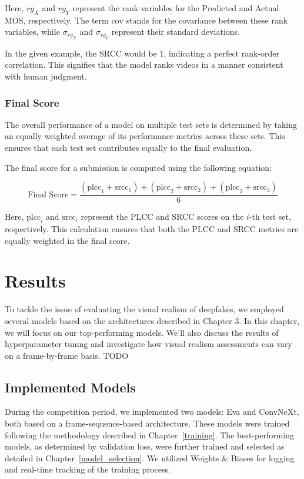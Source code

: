 \documentclass[a4paper,12pt,openright]{book}
\begin{document}
Here, \(rg_X\) and \(rg_Y\) represent the rank variables for the Predicted and Actual MOS, respectively. The term \(\text{cov}\) stands for the covariance between these rank variables, while \(\sigma_{rg_X}\) and \(\sigma_{rg_Y}\) represent their standard deviations. 

In the given example, the SRCC would be 1, indicating a perfect rank-order correlation. This signifies that the model ranks videos in a manner consistent with human judgment.

\subsection{Final Score}

The overall performance of a model on multiple test sets is determined by taking an equally weighted average of its performance metrics across these sets. This ensures that each test set contributes equally to the final evaluation.

The final score for a submission is computed using the following equation:

\[
\text{Final Score} = \frac{(\text{plcc}_1 + \text{srcc}_1) + (\text{plcc}_2 + \text{srcc}_2) + (\text{plcc}_3 + \text{srcc}_3)}{6}
\]


Here, \(\text{plcc}_i\) and \(\text{srcc}_i\) represent the PLCC and SRCC scores on the \(i\)-th test set, respectively. This calculation ensures that both the PLCC and SRCC metrics are equally weighted in the final score.


\chapter{Results}
\label{ch3}
To tackle the issue of evaluating the visual realism of deepfakes, we employed several models based on the architectures described in Chapter 3. In this chapter, we will focus on our top-performing models. We'll also discuss the results of hyperparameter tuning and investigate how visual realism assessments can vary on a frame-by-frame basis. TODO
\section{Implemented Models}
During the competition period, we implemented two models: Eva and ConvNeXt, both based on a frame-sequence-based architecture. These models were trained following the methodology described in Chapter~\ref{training}. The best-performing models, as determined by validation loss, were further trained and selected as detailed in Chapter~\ref{model_selection}. We utilized Weights \& Biases for logging and real-time tracking of the training process. 
\end{document}
